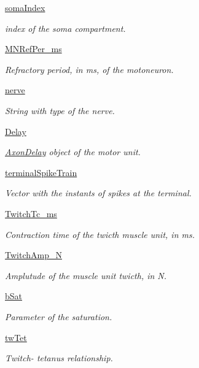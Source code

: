 \begin{DoxyCompactItemize}
\hyperlink{class_motor_unit_1_1_motor_unit_a7cd2be92814b5892bdd18dafd824da9f}{soma\-Index}
\begin{DoxyCompactList}\small\item\em index of the soma compartment. \end{DoxyCompactList}\item 
\hyperlink{class_motor_unit_1_1_motor_unit_abbdaa195ac00926d96d509ae01dcda05}{M\-N\-Ref\-Per\-\_\-ms}
\begin{DoxyCompactList}\small\item\em Refractory period, in ms, of the motoneuron. \end{DoxyCompactList}\item 
\hyperlink{class_motor_unit_1_1_motor_unit_a754ee6b88fc2a09899da9f9b13bfbf59}{nerve}
\begin{DoxyCompactList}\small\item\em String with type of the nerve. \end{DoxyCompactList}\item 
\hyperlink{class_motor_unit_1_1_motor_unit_abe82ffa1e293d10225b67870a962eab8}{Delay}
\begin{DoxyCompactList}\small\item\em \hyperlink{namespace_axon_delay}{Axon\-Delay} object of the motor unit. \end{DoxyCompactList}\item 
\hyperlink{class_motor_unit_1_1_motor_unit_a2e33990aaab69454943aa00db6b8d2eb}{terminal\-Spike\-Train}
\begin{DoxyCompactList}\small\item\em Vector with the instants of spikes at the terminal. \end{DoxyCompactList}\item 
\hyperlink{class_motor_unit_1_1_motor_unit_a083581c89ebb964e58721667307dd2bc}{Twitch\-Tc\-\_\-ms}
\begin{DoxyCompactList}\small\item\em Contraction time of the twicth muscle unit, in ms. \end{DoxyCompactList}\item 
\hyperlink{class_motor_unit_1_1_motor_unit_ad14af870eb3dd7468041853f2c6e8cab}{Twitch\-Amp\-\_\-\-N}
\begin{DoxyCompactList}\small\item\em Amplutude of the muscle unit twicth, in N. \end{DoxyCompactList}\item 
\hyperlink{class_motor_unit_1_1_motor_unit_a2256c241b36e0181e3530e6f791545a0}{b\-Sat}
\begin{DoxyCompactList}\small\item\em Parameter of the saturation. \end{DoxyCompactList}\item 
\hyperlink{class_motor_unit_1_1_motor_unit_a2a466c5f2f798901c1c438f9d57c2221}{tw\-Tet}
\begin{DoxyCompactList}\small\item\em Twitch-\/ tetanus relationship. \end{DoxyCompactList}\end{DoxyCompactItemize}


